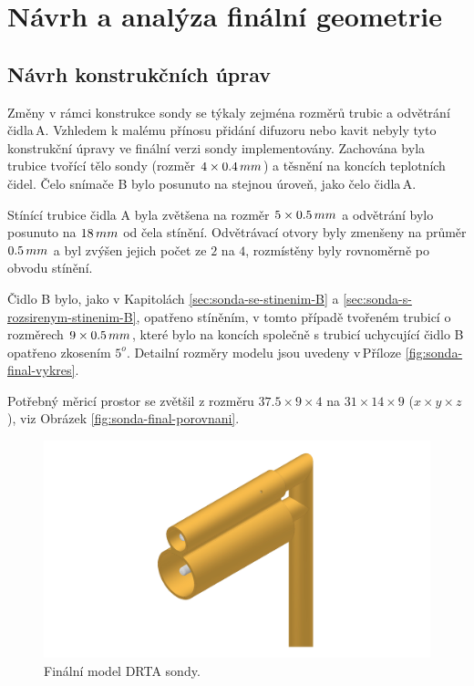 \section{Návrh a analýza finální geometrie} \label{sec:finalni-geometrie}
    \subsection{Návrh konstrukčních úprav}
        Změny v rámci konstrukce sondy se týkaly zejména rozměrů trubic a odvětrání čidla\,A. Vzhledem k malému přínosu přidání difuzoru nebo kavit nebyly tyto konstrukční úpravy ve finální verzi sondy implementovány. Zachována byla trubice tvořící tělo sondy (rozměr $4 \times 0.4 \, mm$) a těsnění na koncích teplotních čidel. Čelo snímače B bylo posunuto na stejnou úroveň, jako čelo čidla\,A. 
        
        Stínící trubice čidla A byla zvětšena na rozměr $5 \times 0.5 \, mm$ a odvětrání bylo posunuto na $18 \, mm$ od čela stínění. Odvětrávací otvory byly zmenšeny na průměr $0.5 \, mm$ a byl zvýšen jejich počet ze $2$ na $4$, rozmístěny byly rovnoměrně po obvodu stínění.

        Čidlo B bylo, jako v Kapitolách \ref{sec:sonda-se-stinenim-B} a \ref{sec:sonda-s-rozsirenym-stinenim-B}, opatřeno stíněním, v tomto případě tvořeném trubicí o rozměrech $9 \times 0.5 \, mm$, které bylo na koncích společně s trubicí uchycující čidlo B opatřeno zkosením $5^o$. Detailní rozměry modelu jsou uvedeny v\,Příloze \ref{fig:sonda-final-vykres}.

        Potřebný měricí prostor se zvětšil z rozměru $37.5 \times 9 \times 4$ na $31 \times 14 \times 9$ ($x \times y \times z$), viz Obrázek \ref{fig:sonda-final-porovnani}.

        \begin{figure}[ht!]
            \centering
            \includegraphics[width=\textwidth]{500_FINAL/sonda_final.png}
            \caption{Finální model DRTA sondy.}
            \label{fig:sonda-final}
        \end{figure}

